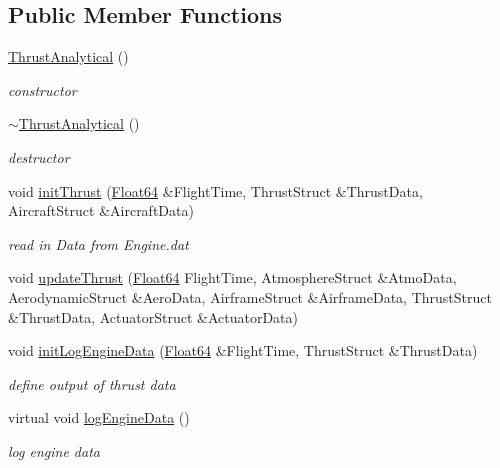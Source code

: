 \subsection*{Public Member Functions}
\begin{DoxyCompactItemize}
\item 
\hyperlink{class_thrust_analytical_a5c75949a22871e861090560adb2d5f18}{Thrust\+Analytical} ()
\begin{DoxyCompactList}\small\item\em constructor \end{DoxyCompactList}\item 
\hyperlink{class_thrust_analytical_aeaf9dd69c10812c673d6cfae0d7ca4fd}{$\sim$\+Thrust\+Analytical} ()
\begin{DoxyCompactList}\small\item\em destructor \end{DoxyCompactList}\item 
void \hyperlink{class_thrust_analytical_ad6d786911957c0d3105a938ff534600a}{init\+Thrust} (\hyperlink{group___tools_ga3f1431cb9f76da10f59246d1d743dc2c}{Float64} \&Flight\+Time, Thrust\+Struct \&Thrust\+Data, Aircraft\+Struct \&Aircraft\+Data)
\begin{DoxyCompactList}\small\item\em read in Data from Engine.\+dat \end{DoxyCompactList}\item 
void \hyperlink{class_thrust_analytical_a2ef6fcb3ba436e41940573917027b9e5}{update\+Thrust} (\hyperlink{group___tools_ga3f1431cb9f76da10f59246d1d743dc2c}{Float64} Flight\+Time, Atmosphere\+Struct \&Atmo\+Data, Aerodynamic\+Struct \&Aero\+Data, Airframe\+Struct \&Airframe\+Data, Thrust\+Struct \&Thrust\+Data, Actuator\+Struct \&Actuator\+Data)
\item 
void \hyperlink{class_thrust_analytical_ae1b4a04fe4f2a7dd41d6b845e5e36a92}{init\+Log\+Engine\+Data} (\hyperlink{group___tools_ga3f1431cb9f76da10f59246d1d743dc2c}{Float64} \&Flight\+Time, Thrust\+Struct \&Thrust\+Data)
\begin{DoxyCompactList}\small\item\em define output of thrust data \end{DoxyCompactList}\item 
virtual void \hyperlink{class_thrust_analytical_aa3ee59637ce7fb0452195e4d02f400e9}{log\+Engine\+Data} ()
\begin{DoxyCompactList}\small\item\em log engine data \end{DoxyCompactList}\end{DoxyCompactItemize}


